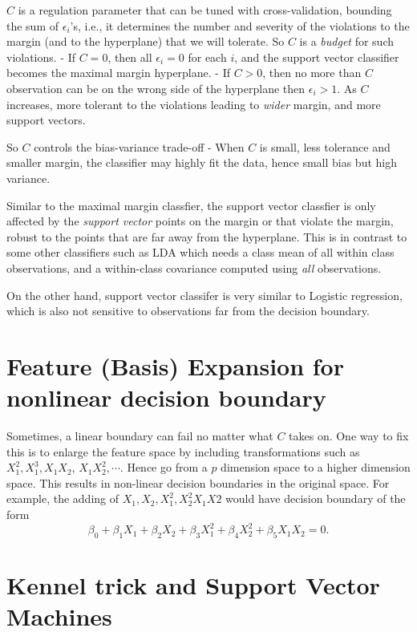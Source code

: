 \documentclass[
  letterpaper,
  DIV=11,
  numbers=noendperiod]{scrreprt}
\begin{document}
\(C\) is a regulation parameter that can be tuned with cross-validation,
bounding the sum of \(\epsilon_i\)'s, i.e., it determines the number and
severity of the violations to the margin (and to the hyperplane) that we
will tolerate. So \(C\) is a \emph{budget} for such violations. - If
\(C=0\), then all \(\epsilon_i=0\) for each \(i\), and the support
vector classifier becomes the maximal margin hyperplane. - If \(C>0\),
then no more than \(C\) observation can be on the wrong side of the
hyperplane then \(\epsilon_i>1\). As \(C\) increases, more tolerant to
the violations leading to \emph{wider} margin, and more support vectors.

So \(C\) controls the bias-variance trade-off - When \(C\) is small,
less tolerance and smaller margin, the classifier may highly fit the
data, hence small bias but high variance.

Similar to the maximal margin classfier, the support vector classfier is
only affected by the \emph{support vector} points on the margin or that
violate the margin, robust to the points that are far away from the
hyperplane. This is in contrast to some other classifiers such as LDA
which needs a class mean of all within class observations, and a
within-class covariance computed using \emph{all} observations.

On the other hand, support vector classifer is very similar to Logistic
regression, which is also not sensitive to observations far from the
decision boundary.

\section{Feature (Basis) Expansion for nonlinear decision
boundary}\label{feature-basis-expansion-for-nonlinear-decision-boundary}

Sometimes, a linear boundary can fail no matter what \(C\) takes on. One
way to fix this is to enlarge the feature space by including
transformations such as \(X_1^2, X_1^3, X_1X_2\), \(X_1X_2^2, \cdots\).
Hence go from a \(p\) dimension space to a higher dimension space. This
results in non-linear decision boundaries in the original space. For
example, the adding of \(X_1, X_2, X_1^2, X_2^2 X_1X2\) would have
decision boundary of the form \[
\beta_0+\beta_1X_1+\beta_2X_2 +\beta_3X_1^2+\beta_4X_2^2 + \beta_5X_1X_2=0. 
\]

\section{Kennel trick and Support Vector
Machines}\label{kennel-trick-and-support-vector-machines}
\end{document}
